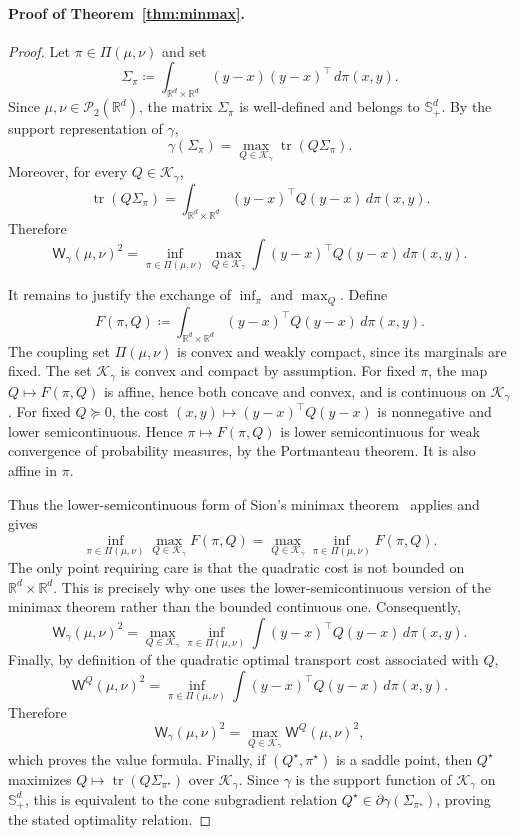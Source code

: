 \documentclass{article}
\newcommand{\R}{\mathbb{R}}
\newcommand{\cP}{\mathcal{P}}
\newcommand{\Wg}{\mathsf{W}_{\gamma}}
\newcommand{\WQ}[1]{\mathsf{W}^{#1}}
\newcommand{\tr}{\operatorname{tr}}
\newcommand{\cK}{\mathcal K_\gamma}
\begin{document}
\paragraph{Proof of Theorem~\ref{thm:minmax}.}
\begin{proof}
Let $\pi\in\Pi(\mu,\nu)$ and set
\[
    \Sigma_\pi
    \coloneqq
    \int_{\R^d\times\R^d}
    (y-x)(y-x)^\top\,d\pi(x,y).
\]
Since $\mu,\nu\in\cP_2(\R^d)$, the matrix $\Sigma_\pi$ is well-defined and
belongs to $\mathbb S_+^d$. By the support representation of $\gamma$,
\[
    \gamma(\Sigma_\pi)
    =
    \max_{Q\in\cK}\tr(Q\Sigma_\pi).
\]
Moreover, for every $Q\in\cK$,
\[
    \tr(Q\Sigma_\pi)
    =
    \int_{\R^d\times\R^d}
    (y-x)^\top Q(y-x)\,d\pi(x,y).
\]
Therefore
\[
    \Wg(\mu,\nu)^2
    =
    \inf_{\pi\in\Pi(\mu,\nu)}
    \max_{Q\in\cK}
    \int
    (y-x)^\top Q(y-x)\,d\pi(x,y).
\]

It remains to justify the exchange of $\inf_\pi$ and $\max_Q$. Define
\[
    F(\pi,Q)
    \coloneqq
    \int_{\R^d\times\R^d}
    (y-x)^\top Q(y-x)\,d\pi(x,y).
\]
The coupling set $\Pi(\mu,\nu)$ is convex and weakly compact, since its
marginals are fixed. The set $\cK$ is convex and compact by assumption. For
fixed $\pi$, the map $Q\mapsto F(\pi,Q)$ is affine, hence both concave and
convex, and is continuous on $\cK$. For fixed $Q\succeq0$, the cost
$(x,y)\mapsto (y-x)^\top Q(y-x)$ is nonnegative and lower semicontinuous.
Hence $\pi\mapsto F(\pi,Q)$ is lower semicontinuous for weak convergence of
probability measures, by the Portmanteau theorem. It is also affine in
$\pi$.

Thus the lower-semicontinuous form of Sion's minimax theorem~\cite{sion1958general}  applies and
gives
\[
    \inf_{\pi\in\Pi(\mu,\nu)}
    \max_{Q\in\cK} F(\pi,Q)
    =
    \max_{Q\in\cK}
    \inf_{\pi\in\Pi(\mu,\nu)} F(\pi,Q).
\]
The only point requiring care is that the quadratic cost is not bounded on
$\R^d\times\R^d$. This is precisely why one uses the lower-semicontinuous
version of the minimax theorem rather than the bounded continuous one. 
%
Consequently,
\[
    \Wg(\mu,\nu)^2
    =
    \max_{Q\in\cK}
    \inf_{\pi\in\Pi(\mu,\nu)}
    \int
    (y-x)^\top Q(y-x)\,d\pi(x,y).
\]
Finally, by definition of the quadratic optimal transport cost associated
with $Q$,
\[
    \WQ{Q}(\mu,\nu)^2
    =
    \inf_{\pi\in\Pi(\mu,\nu)}
    \int
    (y-x)^\top Q(y-x)\,d\pi(x,y).
\]
Therefore
\[
    \Wg(\mu,\nu)^2
    =
    \max_{Q\in\cK}\WQ{Q}(\mu,\nu)^2,
\]
which proves the value formula. Finally, if $(Q^\star,\pi^\star)$ is a saddle
point, then $Q^\star$ maximizes
$Q\mapsto\tr(Q\Sigma_{\pi^\star})$ over $\cK$. Since $\gamma$ is the support
function of $\cK$ on $\mathbb S_+^d$, this is equivalent to the cone
subgradient relation
$Q^\star\in\partial\gamma(\Sigma_{\pi^\star})$, proving the stated
optimality relation.
\end{proof}
\end{document}
